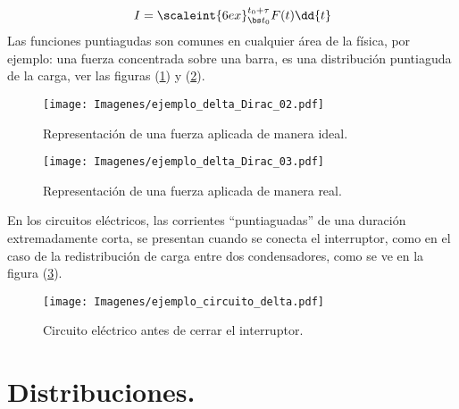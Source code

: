 \begin{align*}
I = \scaleint{6ex}_{\bs t_{0}}^{t_{0} + \tau } F (t) \dd{t}
\end{align*}
Las funciones puntiagudas son comunes en cualquier área de la física, por ejemplo: una fuerza concentrada sobre una barra, es una distribución puntiaguda de la carga, ver las figuras (\ref{fig:figura_delta_Dirac_02}) y (\ref{fig:figura_delta_Dirac_03}). 
\begin{figure}[H]
    \centering
    \texttt{[image: Imagenes/ejemplo\_delta\_Dirac\_02.pdf]}
    \caption{Representación de una fuerza aplicada de manera ideal.}
    \label{fig:figura_delta_Dirac_02}
\end{figure}
\begin{figure}[H]
    \centering
    \texttt{[image: Imagenes/ejemplo\_delta\_Dirac\_03.pdf]}
    \caption{Representación de una fuerza aplicada de manera real.}
    \label{fig:figura_delta_Dirac_03}
\end{figure}
En los circuitos eléctricos, las corrientes \enquote{puntiaguadas} de una duración extremadamente corta, se presentan cuando se conecta el interruptor, como en el caso de la redistribución de carga entre dos condensadores, como se ve en la figura (\ref{fig_figura_delta_Dirac_04}).
\begin{figure}[H]
    \centering
    \texttt{[image: Imagenes/ejemplo\_circuito\_delta.pdf]}
    \caption{Circuito eléctrico antes de cerrar el interruptor.}
    \label{fig_figura_delta_Dirac_04}
\end{figure}

\section{Distribuciones.}

